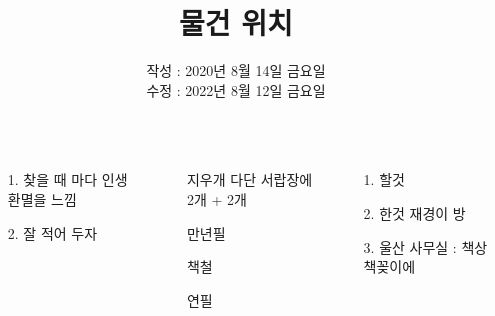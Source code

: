\documentclass[20pt, a1paper ]{tikzposter}
\title{ 물건 위치 }
\author{ 	작성 : 2020년 8월 14일 금요일 \\
			수정 : 2022년 8월 12일 금요일 }
\begin{document}
	\maketitle

	\begin{columns}


			{
				\begin{large}
					\begin{itemize}
					\item [1.] 찾을 때 마다 인생 환멸을 느낌
					\item [2.]  잘 적어 두자
					\end{itemize}
				\end{large}
			}


		{
			\setlength{\leftmargini}{7em}			
			\setlength{\labelsep}{1em} %

			\begin{large}
			\begin{itemize}
			\item [지우개] 다단 서랍장에 2개 + 2개 
			\item [만년필]
			\item [책철] 
			\item [연필] 


			\end{itemize}
			\end{large}

		}

		{
			\setlength{\leftmargini}{5em}			
			\setlength{\labelsep}{1em} %
			\begin{large}
			\begin{itemize}
			\item [1.] 할것 
			\item [2.] 한것 재경이 방
			\item [3.] 울산 사무실 : 책상 책꽂이에 
			\end{itemize}
			\end{large}

}
\end{columns}
\end{document}
